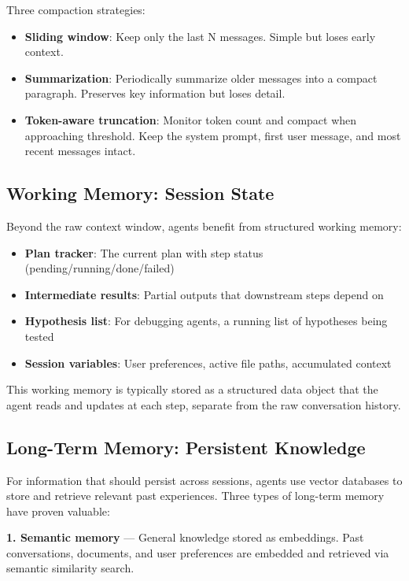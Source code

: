 Three compaction strategies:
\begin{itemize}[leftmargin=*]
    \item \textbf{Sliding window}: Keep only the last N messages. Simple but loses early context.
    \item \textbf{Summarization}: Periodically summarize older messages into a compact paragraph. Preserves key information but loses detail.
    \item \textbf{Token-aware truncation}: Monitor token count and compact when approaching threshold. Keep the system prompt, first user message, and most recent messages intact.
\end{itemize}

\subsection{Working Memory: Session State}

Beyond the raw context window, agents benefit from structured working memory:

\begin{itemize}[leftmargin=*]
    \item \textbf{Plan tracker}: The current plan with step status (pending/running/done/failed)
    \item \textbf{Intermediate results}: Partial outputs that downstream steps depend on
    \item \textbf{Hypothesis list}: For debugging agents, a running list of hypotheses being tested
    \item \textbf{Session variables}: User preferences, active file paths, accumulated context
\end{itemize}

This working memory is typically stored as a structured data object that the agent reads and updates at each step, separate from the raw conversation history.

\subsection{Long-Term Memory: Persistent Knowledge}

For information that should persist across sessions, agents use vector databases to store and retrieve relevant past experiences. Three types of long-term memory have proven valuable:

\textbf{1. Semantic memory} --- General knowledge stored as embeddings. Past conversations, documents, and user preferences are embedded and retrieved via semantic similarity search.

